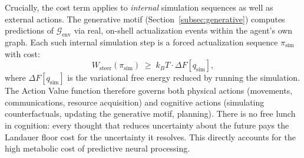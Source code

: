 \documentclass[11pt,a4paper]{article}
\theoremstyle{remark}
\newcommand{\GG}{\mathcal{G}}
\begin{document}
Crucially, the cost term applies to \emph{internal} simulation sequences as well
as external actions. The generative motif (Section~\ref{subsec:generative})
computes predictions of $\GG_{\mathrm{env}}$ via real, on-shell actualization
events within the agent's own graph. Each such internal simulation step is a
forced actualization sequence $\pi_{\mathrm{sim}}$ with cost:
\begin{equation}
  W_{\mathrm{steer}}(\pi_{\mathrm{sim}}) \;\geq\; k_BT \cdot \Delta F[q_{\mathrm{sim}}],
  \label{eq:sim_cost}
\end{equation}
where $\Delta F[q_{\mathrm{sim}}]$ is the variational free energy reduced by
running the simulation. The Action Value function therefore governs both physical
actions (movements, communications, resource acquisition) and cognitive actions
(simulating counterfactuals, updating the generative motif, planning). There is no
free lunch in cognition: every thought that reduces uncertainty about the future
pays the Landauer floor cost for the uncertainty it resolves. This directly
accounts for the high metabolic cost of predictive neural processing.
\end{document}
